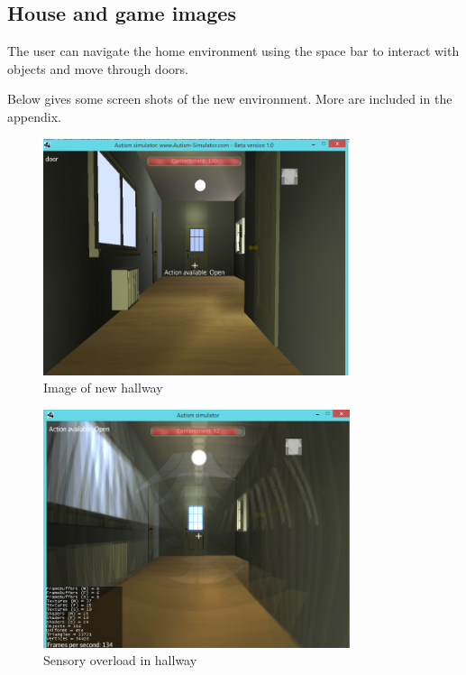 \documentclass[11pt]{report}
\begin{document}
\subsection{House and game images}
The user can navigate the home environment using the space bar to interact with objects and move through doors.

Below gives some screen shots of the new environment. More are included in the appendix. 

\begin{figure}[H]
\centering
\includegraphics[width=90mm]{images/implementationfirst/gameimages/new_hallway1.png}
\caption{Image of new hallway}
\label{newhallway}
\end{figure}


\begin{figure}[H]
\centering
\includegraphics[width=90mm]{images/implementationfirst/gameimages/overloadhallway.png}
\caption{Sensory overload in hallway}
\end{figure}
\end{document}
